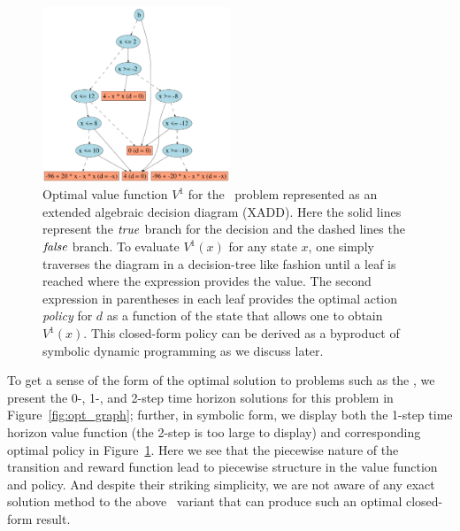 \begin{figure}[t!]
\centering
\includegraphics[width=0.5\textwidth]{Figures1/v2_mr_dd.pdf}
\caption{\footnotesize Optimal value function $V^1$ for the
\MarsRover\ problem represented as an extended algebraic decision
diagram (XADD).  Here the solid lines represent the $\mathit{true}$ branch for
the decision and the dashed lines the $\mathit{false}$ branch.  To evaluate
$V^1(x)$ for any state $x$, one simply traverses the diagram in a
decision-tree like fashion until a leaf is reached where the
expression provides the value.  The second expression in parentheses
in each leaf provides the optimal action \emph{policy} for $d$ as a
function of the state that allows one to obtain $V^1(x)$.  This
closed-form policy can be derived as a byproduct of symbolic dynamic
programming as we discuss later.}
\label{fig:opt_val_pol}
\end{figure}

To get a sense of the form of the optimal solution to problems such as
the \MarsRover, we present the 0-, 1-, and 2-step time horizon solutions
for this problem in Figure~\ref{fig:opt_graph}; further, in symbolic form,
we display both the 1-step time horizon value function (the 2-step is
too large to display) and corresponding optimal policy in
Figure~\ref{fig:opt_val_pol}.  Here we see that the piecewise 
nature of the transition and reward function lead to
piecewise structure in the value function and policy.  And 
despite their striking simplicity, we are not aware of any exact
solution method to the above \MarsRover\ variant that can produce
such an optimal closed-form result.

